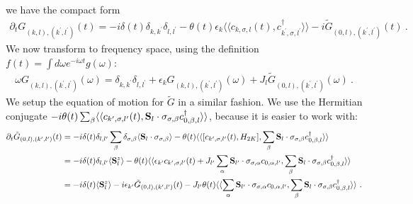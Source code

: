 we have the compact form
\begin{equation}\begin{aligned}
	\partial_t G_{(k, l),(k^\prime,l^\prime)}(t) = -i \delta(t) \delta_{k,k^\prime}\delta_{l,l^\prime} - \theta(t) \epsilon_k \langle \langle c_{k,\sigma,l}(t), c^\dagger_{k^\prime,\sigma,l^\prime} \rangle  \rangle - i \tilde G_{(0,l),(k^\prime,l^\prime)}(t)~.
\end{aligned}\end{equation}
We now transform to frequency space, using the definition \(f(t) = \int d\omega e^{-i\omega t} g(\omega)\):
\begin{equation}\begin{aligned}\label{GkkFrequency2K}
	\omega G_{(k, l),(k^\prime,l^\prime)}(\omega) = \delta_{k,k^\prime}\delta_{l,l^\prime} + \epsilon_k G_{(k,l),(k^\prime,l^\prime)}(\omega) + J_l\tilde G_{(0,l),(k^\prime,l^\prime)}(\omega)~.
\end{aligned}\end{equation}
We setup the equation of motion for \(\tilde G\) in a similar fashion. We use the Hermitian conjugate \(-i\theta(t)\sum_\beta \langle \langle c_{k^\prime,\sigma,l^\prime}(t), {\bf S}_l\cdot \sigma_{\sigma,\beta} c^\dagger_{0,\beta,l} \rangle  \rangle\), because it is easier to work with:
\begin{equation}\begin{aligned}
	\partial_t\tilde G_{(0,l),(k^\prime,l^\prime)}(t) &= -i\delta(t)\delta_{l,l^\prime}\sum_\beta \delta_{\sigma,\beta} \langle {\bf S}_l\cdot \sigma_{\sigma,\beta} \rangle - \theta(t)\langle \langle [c_{k^\prime,\sigma,l^\prime}(t), H_{2K}], \sum_\beta {\bf S}_l\cdot \sigma_{\sigma,\beta} c^\dagger_{0,\beta,l} \rangle  \rangle\\
													  &=-i\delta(t)\delta_{l,l^\prime}\langle {\bf S}^z_l \rangle - \theta(t) \langle \langle \epsilon_{k^\prime} c_{k^\prime,\sigma,l^\prime}(t) + J_{l^\prime}\sum_{\alpha} {\bf S}_{l^\prime}\cdot \sigma_{\sigma,\alpha} c_{0,\alpha,l^\prime}, \sum_\beta {\bf S}_l\cdot \sigma_{\sigma,\beta} c^\dagger_{0,\beta,l} \rangle  \rangle\\
													  &=-i\delta(t)\langle {\bf S}^z_l \rangle -i \epsilon_{k^\prime} \tilde G_{(0,l), (k^\prime,l^\prime)}(t) - J_{l^\prime} \theta(t) \langle \langle \sum_{\alpha} {\bf S}_{l^\prime}\cdot \sigma_{\sigma,\alpha} c_{0,\alpha,l^\prime}, \sum_\beta {\bf S}_l\cdot \sigma_{\sigma,\beta} c^\dagger_{0,\beta,l} \rangle  \rangle~.
\end{aligned}\end{equation}
